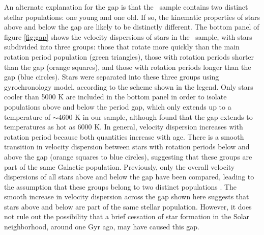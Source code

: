 An alternate explanation for the gap is that the \mct\ sample contains two
distinct stellar populations: one young and one old.
If so, the kinematic properties of stars above and below the gap are likely to
be distinctly different.
The bottom panel of figure \ref{fig:gap} shows the velocity dispersions of
stars in the \mct\ sample, with stars subdivided into three groups: those that
rotate more quickly than the main rotation period population (green
triangles), those with rotation periods shorter than the gap (orange squares),
and those with rotation periods longer than the gap (blue circles).
Stars were separated into these three groups using \citet{angus2019}
gyrochronology model, according to the scheme shown in the legend.
Only stars cooler than 5000 K are included in the bottom panel in order to
isolate populations above and below the period gap, which only extends up to a
temperature of $\sim$4600 K in our sample, although \citet{davenport2017}
found that the gap extends to temperatures as hot as 6000 K.
In general, velocity dispersion increases with rotation period because both
quantities increase with age.
There is a smooth transition in velocity dispersion between stars with
rotation periods below and above the gap (orange squares to blue circles),
suggesting that these groups are part of the same Galactic population.
Previously, only the overall velocity dispersions of all stars above and below
the gap have been compared, leading to the assumption that these groups belong
to two distinct populations \citep{mcquillan2014}.
The smooth increase in velocity dispersion across the gap shown here suggests
that stars above and below are part of the same stellar population.
However, it does not rule out the possibility that a brief cessation of star
formation in the Solar neighborhood, around one Gyr ago, may have caused this
gap.

